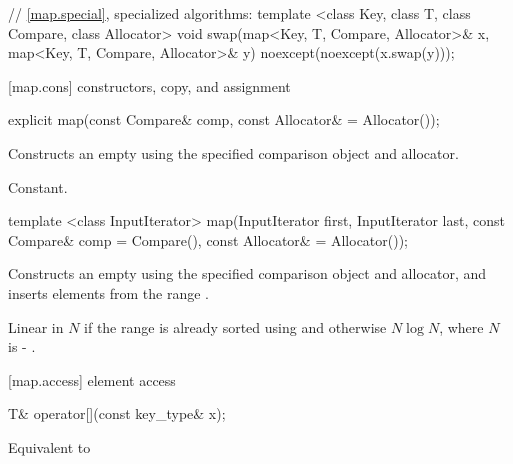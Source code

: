 \begin{codeblock}
{  // \ref{map.special}, specialized algorithms:
  template <class Key, class T, class Compare, class Allocator>
    void swap(map<Key, T, Compare, Allocator>& x,
              map<Key, T, Compare, Allocator>& y)
      noexcept(noexcept(x.swap(y)));
}
\end{codeblock}


[map.cons]{ constructors, copy, and assignment}%
%

%
%
\begin{itemdecl}
explicit map(const Compare& comp, const Allocator& = Allocator());
\end{itemdecl}

\begin{itemdescr}
\pnum
\effects
Constructs an empty
using the specified comparison object and allocator.

\pnum
\complexity
Constant.
\end{itemdescr}

%
\begin{itemdecl}
template <class InputIterator>
  map(InputIterator first, InputIterator last,
      const Compare& comp = Compare(), const Allocator& = Allocator());
\end{itemdecl}

\begin{itemdescr}
\pnum
\effects
Constructs an empty
using the specified comparison object and allocator,
and inserts elements from the range
.

\pnum
\complexity
Linear in $N$ if the range
is already sorted using 
and otherwise $N \log{N}$, where $N$
is  - .
\end{itemdescr}

[map.access]{ element access}

%
\begin{itemdecl}
T& operator[](const key_type& x);
\end{itemdecl}

\begin{itemdescr}
\pnum
\effects
Equivalent to 
\end{itemdescr}

